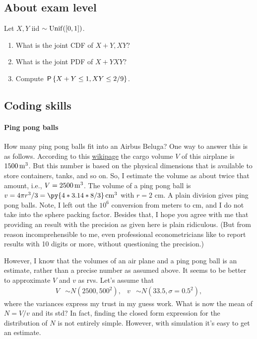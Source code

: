 \documentclass[assignments]{subfiles}
\begin{document}
\subsection{About exam level}
\label{sec:chapter-8}

\begin{exercise}
Let $X, Y$ iid $\sim \Unif{[0,1]}$.
\begin{enumerate}
\item What is the joint CDF of $X+Y, XY$?
\item What is the joint PDF of $X+Y XY$?
\item Compute $\P{X+Y\leq 1, XY\leq 2/9}$.
\end{enumerate}
\end{exercise}

\subsection{Coding skills}
\label{sec:coding-skills-1}

\paragraph{Ping pong balls}



How many ping pong balls fit into an Airbus Beluga?
One way to answer this is as follows.
According to this \href{https://en.wikipedia.org/wiki/Airbus\_Beluga}{wikipage} the cargo volume $V$ of this airplane is $1500 \m^{3}$.
But this number is based on the physical dimensions that is available to store containers, tanks, and so on.
So, I estimate the volume as about twice that amount, i.e., $V = 2500 \m^{3}$.
The volume of a ping pong ball is $v = 4 \pi r^3/3  = \py{4*3.14*8/3} \cm^{3}$ with $r=2$ cm.
A plain division gives  ping pong balls.
Note, I left out the $10^{6}$ conversion from meters to cm, and I do not take into the sphere packing factor.
Besides that, I hope you agree with me that providing an result with the precision as given here is plain ridiculous.
(But from reason incomprehensible to me, even professional econometricians like to report results with 10 digits or more, without questioning the precision.)


However, I know that the volumes of an air plane and a ping pong ball is an estimate, rather than a precise number as assumed above.
It seems to be better to approximate $V$ and $v$ as rvs.
Let's assume that
   \begin{align*}
V & \sim N(2500, 500^{2}), & v  & \sim N(33.5, \sigma=0.5^{2}),
\end{align*}
where the variances express my trust in my guess work.
What is now the mean of $N = V/v$ and its std?
In fact, finding the closed form expression for the distribution of $N$ is not entirely simple.
However, with simulation it's easy to get an estimate.
\end{document}
